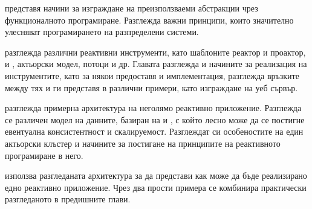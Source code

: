  представя начини за изграждане на преизползваеми абстракции чрез функционалното програмиране. Разглежда важни принципи, които значително улесняват програмирането на разпределени системи.

 разглежда различни реактивни инструменти, като шаблоните реактор и проактор,  и , актьорски модел, потоци и др. Главата разглежда и начините за реализация на инструментите, като за някои предоставя и имплементация, разглежда връзките между тях и ги представя в различни примери, като изграждане на уеб сървър.

 разглежда примерна архитектура на неголямо реактивно приложение. Разглежда се различен модел на данните, базиран на  и , с който лесно може да се постигне евентуална консистентност и скалируемост. Разглеждат си особеностите на един актьорски клъстер и начините за постигане на принципите на реактивното програмиране в него.

 използва разгледаната архитектура за да представи как може да бъде реализирано едно реактивно приложение. Чрез два прости примера се комбинира практически разгледаното в предишните глави.
